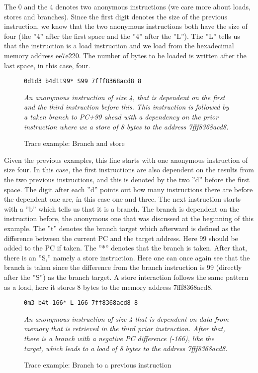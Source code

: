 The 0 and the 4 denotes two anonymous instructions (we care more about loads,
stores and branches). Since the first digit denotes the size of the previous instruction, we know that the two anonymous instructions both have the size of four (the ”4” after
the first space and the ”4” after the ”L”). The ”L” tells us that the instruction is
a load instruction and we load from the hexadecimal memory address ee7e220. The
number of bytes to be loaded is written after the last space, in this case, four.

\begin{figure}[h]
\begin{lstlisting}[frame=single]  
0d1d3 b4d1t99* S99 7fff8368acd8 8
\end{lstlisting}
\centering
\emph{An anonymous instruction of size 4, that is dependent on the first and the third instruction before this. This instruction is followed by a taken branch to PC+99 ahead with
a dependency on the prior instruction where we a store of 8 bytes to the address
7fff8368acd8.}
  \caption{Trace example: Branch and store}
\end{figure}

Given the previous examples, this line starts with one anonymous instruction of
size four. In this case, the first instructions are also dependent on the results from the
two previous instructions, and this is denoted by the two ”d” before the first space. The
digit after each ”d” points out how many instructions there are before the dependent one are,
ín this case one and three. The next instruction starts with a ”b” which tells us that it is a
branch. The branch is dependent on the instruction before, the anonymous one that
was discussed at the beginning of this example. The ”t” denotes the branch target
which afterward is defined as the difference between the current PC and the target address. Here 99 should be added to the PC if taken. The ”*” denotes that the branch is taken. After
that, there is an ”S,” namely a store instruction. Here one can once again see that the
branch is taken since the difference from the branch instruction is 99 (directly after
the ”S”) as the branch target. A store interaction follows the same pattern as a load,
here it stores 8 bytes to the memory address 7fff8368acd8.

\begin{figure}[h]
\begin{lstlisting}[frame=single]  
0m3 b4t-166* L-166 7ff8368acd8 8
\end{lstlisting}
\centering
\emph{An anonymous instruction of size 4 that is dependent on data from memory that is retrieved in the third prior instruction. After that, there is a branch with a
negative PC difference (-166), like the target, which leads to a load of 8 bytes to the
address 7fff8368acd8.}
  \caption{Trace example: Branch to a previous instruction}
\end{figure}

